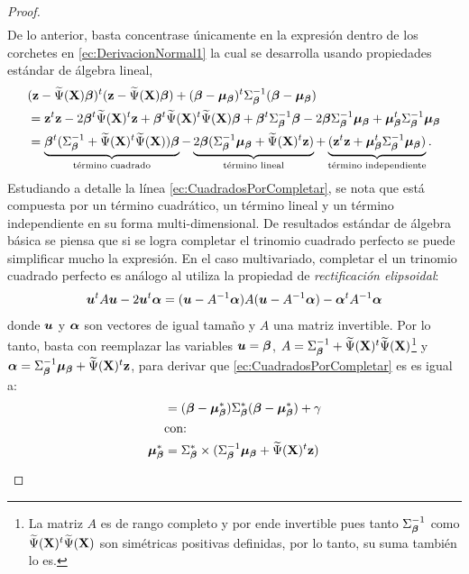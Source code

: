 \documentclass[../../Main/Main.tex]{subfiles}
\begin{document}
\begin{proof}
\begin{align}
\end{align}
De lo anterior, basta concentrase únicamente en la expresión dentro de los corchetes en \eqref{ec:DerivacionNormal1} la cual se desarrolla usando propiedades estándar de álgebra lineal,
\begin{align}
& (\mathbf{z} - \widetilde{\Psi}(\mathbf{X}) \bm{\beta})^t(\mathbf{z} - \widetilde{\Psi}(\mathbf{X})\bm{\beta}) + (\bm{\beta} - \bm{\mu}_{\bm{\beta}})^t\Sigma_{\bm{\beta}}^{-1}(\bm{\beta} - \bm{\mu}_{\bm{\beta}}) \nonumber \\
& = \mathbf{z}^t\mathbf{z} -2\bm{\beta}^t\widetilde{\Psi}(\mathbf{X})^t\mathbf{z} + \bm{\beta}^t\widetilde{\Psi}(\mathbf{X})^t\widetilde{\Psi}(\mathbf{X})\bm{\beta} + \bm{\beta}^t\Sigma_{\bm{\beta}}^{-1}\bm{\beta} - 2\bm{\beta} \Sigma_{\bm{\beta}}^{-1}\bm{\mu}_{\bm{\beta}} +\bm{\mu}_{\bm{\beta}}^t\Sigma_{\bm{\beta}}^{-1}\bm{\mu}_{\bm{\beta}} \nonumber \\
& = \underbrace{\bm{\beta}^t(\Sigma_{\bm{\beta}}^{-1} + \widetilde{\Psi}(\mathbf{X})^t\widetilde{\Psi}(\mathbf{X}))\bm{\beta}}_{\text{término cuadrado}} - \underbrace{2\bm{\beta}(\Sigma_{\bm{\beta}}^{-1}\bm{\mu}_{\bm{\beta}} + \widetilde{\Psi}(\mathbf{X})^t\mathbf{z})}_{\text{término lineal}} + \underbrace{(\mathbf{z}^t\mathbf{z} + \bm{\mu}_{\bm{\beta}}^t\Sigma_{\bm{\beta}}^{-1}\bm{\mu}_{\bm{\beta}})}_{\text{término independiente}}. \label{ec:CuadradosPorCompletar}
\end{align}
Estudiando a detalle la línea \eqref{ec:CuadradosPorCompletar}, se nota que está compuesta por un término cuadrático, un término lineal y un término independiente en su forma multi-dimensional. De resultados estándar de álgebra básica se piensa que si se logra completar el trinomio cuadrado perfecto se puede simplificar mucho la expresión. En el caso multivariado, completar el un trinomio cuadrado perfecto es análogo al utiliza la propiedad de \emph{rectificación elipsoidal}:
\begin{align*}
\bm{u}^t A\bm{u} - 2\bm{u}^t\bm{\alpha} = (\bm{u} - A^{-1}\bm{\alpha})A(\bm{u} - A^{-1}\bm{\alpha}) - \bm{\alpha}^tA^{-1}\bm{\alpha}
\end{align*} 
donde $\bm{u}$ y $\bm{\alpha}$ son vectores de igual tamaño y $A$ una matriz invertible. Por lo tanto, basta con reemplazar las variables $\bm{u} = \bm{\beta}$, $A = \Sigma_{\bm{\beta}}^{-1} + \widetilde{\Psi}(\mathbf{X})^t\widetilde{\Psi}(\mathbf{X})$\footnote{La matriz $A$ es de rango completo y por ende invertible pues tanto $\Sigma_{\bm{\beta}}^{-1}$ como $\widetilde{\Psi}(\mathbf{X})^t\widetilde{\Psi}(\mathbf{X})$ son simétricas positivas definidas, por lo tanto, su suma también lo es.} y $\bm{\alpha} = \Sigma_{\bm{\beta}}^{-1}\bm{\mu}_{\bm{\beta}} + \widetilde{\Psi}(\mathbf{X})^t\mathbf{z}$, para derivar que \eqref{ec:CuadradosPorCompletar} es es igual a:
\begin{align}
& = (\betabf - \mubeta^*)\Sigmabeta^*(\betabf - \mubeta^*) + \gamma \label{ec:CuadradosCompletados} \\
& \text{con:} \nonumber\\
	\mubeta^* &= \Sigmabeta^* \times (\Sigmabeta^{-1}\mubeta + \tildePsi^t\zsn ) \nonumber \\[2pt]

\end{align}
\end{proof}
\end{document}
